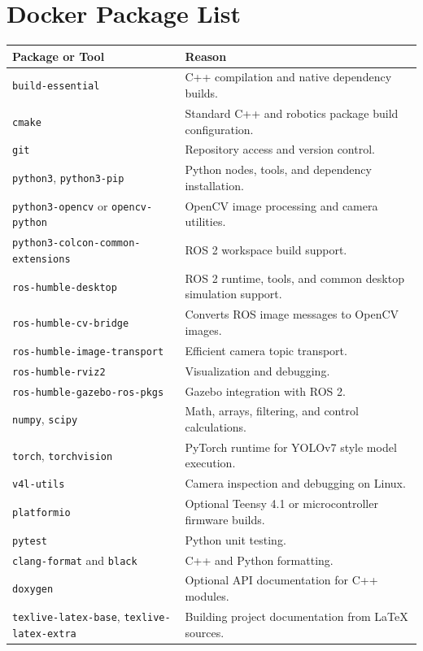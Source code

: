 \documentclass[12pt]{article}
\begin{document}
\section{Docker Package List}
\begin{longtable}{|p{}|p{}|}
\hline
\textbf{Package or Tool} & \textbf{Reason} \\
\hline
\texttt{build-essential} & C++ compilation and native dependency builds. \\
\hline
\texttt{cmake} & Standard C++ and robotics package build configuration. \\
\hline
\texttt{git} & Repository access and version control. \\
\hline
\texttt{python3}, \texttt{python3-pip} & Python nodes, tools, and dependency installation. \\
\hline
\texttt{python3-opencv} or \texttt{opencv-python} & OpenCV image processing and camera utilities. \\
\hline
\texttt{python3-colcon-common-extensions} & ROS 2 workspace build support. \\
\hline
\texttt{ros-humble-desktop} & ROS 2 runtime, tools, and common desktop simulation support. \\
\hline
\texttt{ros-humble-cv-bridge} & Converts ROS image messages to OpenCV images. \\
\hline
\texttt{ros-humble-image-transport} & Efficient camera topic transport. \\
\hline
\texttt{ros-humble-rviz2} & Visualization and debugging. \\
\hline
\texttt{ros-humble-gazebo-ros-pkgs} & Gazebo integration with ROS 2. \\
\hline
\texttt{numpy}, \texttt{scipy} & Math, arrays, filtering, and control calculations. \\
\hline
\texttt{torch}, \texttt{torchvision} & PyTorch runtime for YOLOv7 style model execution. \\
\hline
\texttt{v4l-utils} & Camera inspection and debugging on Linux. \\
\hline
\texttt{platformio} & Optional Teensy 4.1 or microcontroller firmware builds. \\
\hline
\texttt{pytest} & Python unit testing. \\
\hline
\texttt{clang-format} and \texttt{black} & C++ and Python formatting. \\
\hline
\texttt{doxygen} & Optional API documentation for C++ modules. \\
\hline
\texttt{texlive-latex-base}, \texttt{texlive-latex-extra} & Building project documentation from LaTeX sources. \\
\hline
\end{longtable}
\end{document}
